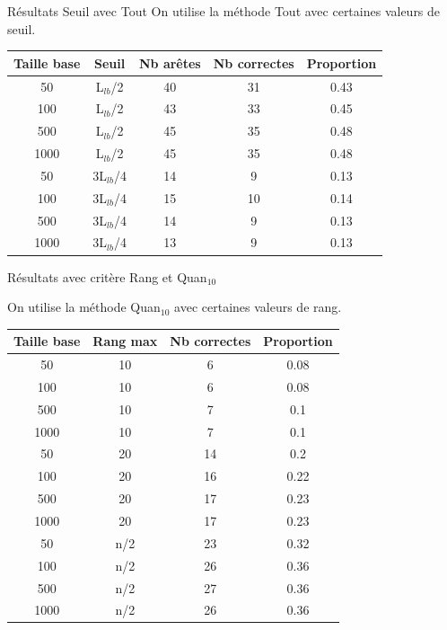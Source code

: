 \documentclass{beamer}
\begin{document}
\begin{frame}{Résultats Seuil avec Tout}
On utilise la méthode Tout avec certaines valeurs de seuil.
\begin{tabular}{|c|c|c|c|c|}
   \hline
   Taille base & Seuil & Nb arêtes & Nb correctes & Proportion\\
   \hline
   50 & L$_{lb}$/2 & 40 & 31 & 0.43  \\
   \hline
   100 & L$_{lb}$/2 & 43 & 33 & 0.45  \\
   \hline
   500 & L$_{lb}$/2 & 45 & 35 & 0.48  \\
   \hline
   1000 & L$_{lb}$/2 & 45 & 35 & 0.48  \\
   \hline
   \hline
   50 & 3L$_{lb}$/4 & 14 & 9 & 0.13  \\
   \hline
   100 & 3L$_{lb}$/4 & 15 & 10 & 0.14  \\
   \hline
   500 & 3L$_{lb}$/4 & 14 & 9 & 0.13  \\
   \hline
   1000 & 3L$_{lb}$/4 & 13 & 9 & 0.13  \\
   \hline
\end{tabular}
\end{frame}


\begin{frame}{Résultats avec critère Rang et Quan$_{10}$}

On utilise la méthode Quan$_{10}$ avec certaines valeurs de rang.
\begin{tabular}{|c|c|c|c|}
   \hline
   Taille base & Rang max & Nb correctes & Proportion\\
   \hline
   50 & 10  & 6 & 0.08  \\
   \hline
   100 & 10  & 6 & 0.08  \\
   \hline
   500 & 10  & 7 & 0.1  \\
   \hline
   1000 & 10 & 7 & 0.1  \\
   \hline
   \hline
   50 & 20 & 14 & 0.2  \\
   \hline
   100 & 20 & 16 & 0.22  \\
   \hline
   500 & 20 & 17 & 0.23  \\
   \hline
   1000 & 20 & 17 & 0.23  \\
   \hline
   50 & n/2 & 23 & 0.32  \\
   \hline
   100 & n/2 & 26 & 0.36  \\
   \hline
   500 & n/2 & 27 & 0.36  \\
   \hline
   1000 & n/2 & 26 & 0.36  \\
   \hline
\end{tabular}

\end{frame}
\end{document}
